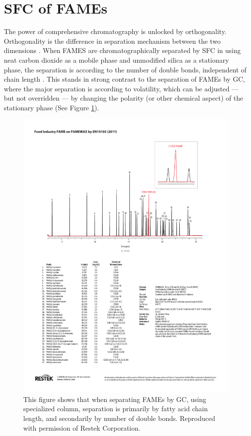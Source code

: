 \section{SFC of FAMEs}

The power of comprehensive chromatography is unlocked by orthogonality.
Orthogonality is the difference in separation mechanism between the two
dimensions \autocite{Marriott2012}. When FAMES are chromatographically separated
by SFC in using neat carbon dioxide as a mobile phase and unmodified silica as a
stationary phase, the separation is according to the number of double bonds,
independent of chain length \autocite{Robertson1991, Smith1994, Smith2001}. This
stands in strong contrast to the separation of FAMEs by GC, where the major
separation is according to volatility, which can be adjusted --- but not
overridden --- by changing the polarity (or other chemical aspect) of the
stationary phase (See Figure \ref{fig:RestekFAMEsGC}).

\begin{figure}
\centering
\includegraphics[width=\textwidth]{Figures/GC_PC1332.pdf}
\decoRule

\caption[Separation of FAME by GC]{This figure shows that when separating FAMEs
by GC, using specialized column, separation is primarily by fatty acid chain
length, and secondarily by number of double bonds. Reproduced with permission of Restek Corporation.}

\label{fig:RestekFAMEsGC}
\end{figure}

